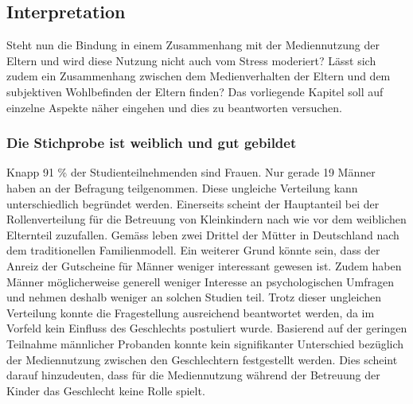 \subsection{Interpretation} \label{sec:Interpretation}
Steht nun die Bindung in einem Zusammenhang mit der Mediennutzung der Eltern und wird diese Nutzung nicht auch vom Stress moderiert? Lässt sich zudem ein Zusammenhang zwischen dem Medienverhalten der Eltern und dem subjektiven Wohlbefinden der Eltern finden? Das vorliegende Kapitel soll auf einzelne Aspekte näher eingehen und dies zu beantworten versuchen.

\subsubsection{Die Stichprobe ist weiblich und gut gebildet}
Knapp 91 \% der Studienteilnehmenden sind Frauen. Nur gerade 19 Männer haben an der Befragung teilgenommen. Diese ungleiche Verteilung kann unterschiedlich begründet werden. Einerseits scheint der Hauptanteil bei der Rollenverteilung für die Betreuung von Kleinkindern nach wie vor dem weiblichen Elternteil zuzufallen. Gemäss  leben zwei Drittel der Mütter in Deutschland nach dem traditionellen Familienmodell. Ein weiterer Grund könnte sein, dass der Anreiz der Gutscheine für Männer weniger interessant gewesen ist. Zudem haben Männer möglicherweise generell weniger Interesse an psychologischen Umfragen und nehmen deshalb weniger an solchen Studien teil. Trotz dieser ungleichen Verteilung konnte die Fragestellung ausreichend beantwortet werden, da im Vorfeld kein Einfluss des Geschlechts postuliert wurde. Basierend auf der geringen Teilnahme männlicher Probanden konnte kein signifikanter Unterschied bezüglich der Mediennutzung zwischen den Geschlechtern festgestellt werden. Dies scheint darauf hinzudeuten, dass für die Mediennutzung während der Betreuung der Kinder das Geschlecht keine Rolle spielt.

